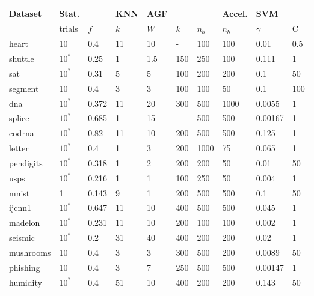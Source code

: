 
\begin{tabular}{|l||ll|l|lll|l|ll|}
	\hline
Dataset	& Stat. & & KNN & AGF & & & Accel. & SVM & \\\hline
 & trials & $f$ & $k$ & $W$ & $k$ & $n_b$ & $n_b$ & $\gamma$ & C\\\hline\hline
	heart & 10 & 0.4 & 11 & 10 & - & 100 & 100 & 0.01 & 0.5 \\
	shuttle & $10^*$ & 0.25 & 1 & 1.5 & 150 & 250 & 100 & 0.111 & 1 \\
	sat & $10^*$ & 0.31 & 5 & 5 & 100 & 200 & 200 & 0.1 & 50\\
	segment & 10 & 0.4 & 3 & 3 & 100 & 100 & 50 & 0.1 & 100 \\
	dna & $10^*$ & 0.372 & 11 & 20 & 300 & 500 & 1000 & 0.0055 & 1 \\
	splice & $10^*$ & 0.685 & 1 & 15 & - & 500 & 500 & 0.00167 & 1 \\
	codrna & $10^*$ & 0.82 & 11 & 10 & 200 & 500 & 500 & 0.125 & 1 \\
	letter & $10^*$ & 0.4 & 1 & 3 & 200 & 1000 & 75 & 0.065 & 1 \\
	pendigits & $10^*$ & 0.318 & 1 & 2 & 200 & 200 & 50 & 0.01 & 50 \\
	usps & $10^*$ & 0.216 & 1 & 1 & 100 & 250 & 50 & 0.004 & 1 \\
	mnist & 1 & 0.143 & 9 & 1 & 200 & 500 & 500 & 0.1 & 50 \\
	ijcnn1 & $10^*$ & 0.647 & 11 & 10 & 400 & 500 & 500 & 0.045 & 1 \\
	madelon & $10^*$ & 0.231 & 11 & 10 & 200 & 100 & 100 & 0.002 & 1 \\
	seismic & $10^*$ & 0.2 & 31 & 40 & 400 & 200 & 200 & 0.02 & 1 \\
	mushrooms & 10 & 0.4 & 3 & 3 & 300 & 500 & 200 & 0.0089 & 50 \\
	phishing & 10 & 0.4 & 3 & 7 & 250 & 500 & 500 & 0.00147 & 1 \\
	humidity & $10^*$ & 0.4 & 51 & 10 & 400 & 200 & 200 & 0.143 & 50 \\
	\hline
\end{tabular}

